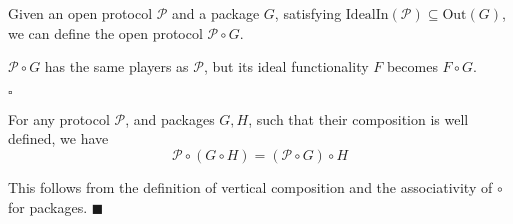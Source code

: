 \begin{definition}
Given an open protocol $\mathcal{P}$ and a package $G$, satisfying
$\text{IdealIn}(\mathcal{P}) \subseteq \text{Out}(G)$,
we can define the open protocol $\mathcal{P} \circ G$.

$\mathcal{P} \circ G$ has the same players as $\mathcal{P}$,
but its ideal functionality $F$ becomes $F \circ G$.

$\square$
\end{definition}

\begin{claim}
For any protocol $\mathcal{P}$, and packages $G, H$, such that their composition
is well defined, we have
$$
\mathcal{P} \circ (G \circ H) = (\mathcal{P} \circ G) \circ H
$$

 This follows from the definition of vertical composition
and the associativity of $\circ$ for packages.
$\blacksquare$
\end{claim}

